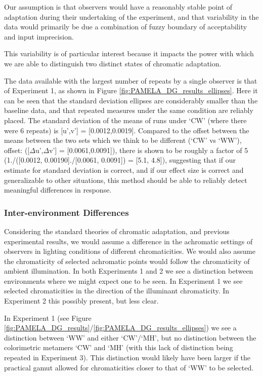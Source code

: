 Our assumption is that observers would have a reasonably stable point of adaptation during their undertaking of the experiment, and that variability in the data would primarily be due a combination of fuzzy boundary of acceptability and input imprecision. 

This variability is of particular interest because it impacts the power with which we are able to distinguish two distinct states of chromatic adaptation.

The data available with the largest number of repeats by a single observer is that of Experiment 1, as shown in Figure \ref{fig:PAMELA_DG_results_ellipses}. Here it can be seen that the standard deviation ellipses are considerably smaller than the baseline data, and that repeated measures under the same condition are reliably placed. The standard deviation of the means of runs under `CW' (where there were 6 repeats) is [u',v'] = [0.0012,0.0019]. Compared to the offset between the means between the two sets which we think to be different (`CW' vs `WW'), offset: ([$\Delta$u',$\Delta$v'] = [0.0061,0.0091]), there is shown to be roughly a factor of 5 (1./([0.0012, 0.00190]./[0.0061, 0.0091]) = [5.1, 4.8]), suggesting that if our estimate for standard deviation is correct, and if our effect size is correct and generalizable to other situations, this method should be able to reliably detect meaningful differences in response.

\subsubsection{Inter-environment Differences}

Considering the standard theories of chromatic adaptation, and previous experimental results, we would assume a difference in the achromatic settings of observers in lighting conditions of different chromaticities. We would also assume the chromaticity of selected achromatic points would follow the chromaticity of ambient illumination. In both Experiments 1 and 2 we see a distinction between environments where we might expect one to be seen. In Experiment 1 we see selected chromaticities in the direction of the illuminant chromaticity. In Experiment 2 this possibly present, but less clear.

In Experiment 1 (see Figure \ref{fig:PAMELA_DG_results}/\ref{fig:PAMELA_DG_results_ellipses}) we see a distinction between `WW' and either `CW'/`MH', but no distinction between the colorimetric metamers `CW' and `MH' (with this lack of distinction being repeated in Experiment 3). This distinction would likely have been larger if the practical gamut allowed for chromaticities closer to that of `WW' to be selected. 

